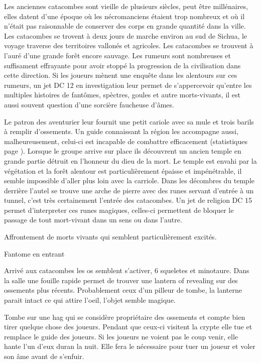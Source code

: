 Les anciennes catacombes sont vieille de plusieurs siècles, peut être millénaires, elles datent d'une époque où 
les nécromanciens étaient trop nombreux et où il n'était pas raisonnable de conserver des corps 
en grande quantité dans la ville. Les catacombes se trovent à deux jours de marche environ au sud 
de Sichua, le voyage traverse des territoires vallonés et agricoles. Les catacombes se trouvent à
l'auré d'une grande forêt encore sauvage. Les rumeurs sont nombreuses et suffisament effrayante pour
avoir stoppé la progression de la civilisation dans cette direction. Si les joueurs mènent une enquête
dans les alentours sur ces rumeurs, un jet DC 12 en investigation leur permet de s'appercevoir qu'entre
les multiples histoires de fantômes, spèctres, goules et autre morts-vivants, il est aussi souvent 
question d'une sorcière faucheuse d'âmes.

Le patron des aventurier leur fournit une petit cariole avec sa mule et trois barils à remplir 
d'ossements. Un guide connaissant la région les accompagne aussi, malheureusement, celui-ci est
incapable de combattre efficacement (statistiques page \pageref{Eclaireur}). Lorsque le groupe
arrive sur place ils découvrent un ancien temple en grande partie détruit en l'honneur du dieu 
de la mort. Le temple est envahi par la végétation et la forêt alentour est particulièrement
épaisse et impénétrable, il semble impossible d'aller plus loin avec la carriole. Dans les 
décombres du temple derrière l'autel se trouve une arche de pierre avec des runes servant 
d'entrée à un tunnel, c'est très certainement l'entrée des catacombes. Un jet de religion
DC 15 permet d'interpreter ces runes magiques, celles-ci permettent de bloquer le passage
de tout mort-vivant dans un sens ou dans l'autre.

Affrontement de morts vivants qui semblent particulièrement excités.

Fantome en entrant

Arrivé aux catacombes les os semblent s'activer, 6 squeletes et minotaure.
Dans la salle une fouille rapide permet de trouver une lantern of revealing 
sur des ossements plus récents. Probablement ceux d'un pilleur de tombe, la 
lanterne parait intact ce qui attire l'oeil, l'objet semble magique.

Tombe sur une hag qui se considère propriétaire des ossements et compte bien tirer quelque chose des joueurs.
Pendant que ceux-ci visitent la crypte elle tue et remplace le guide des joueurs. Si les joueurs ne voient pas le coup
venir, elle hante l'un d'eux duran la nuit. Elle fera le nécessaire pour tuer un joueur et voler son âme avant de s'enfuir.

